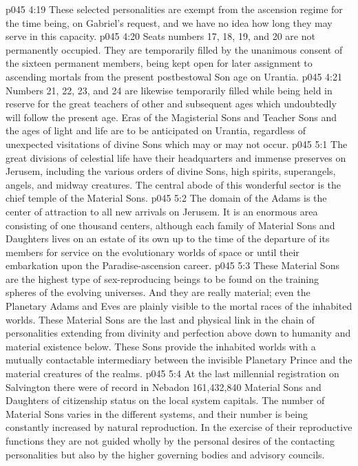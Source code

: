 \pc \vs p045 4:19 These selected personalities are exempt from the ascension regime for the time being, on Gabriel’s request, and we have no idea how long they may serve in this capacity.
\vs p045 4:20 Seats numbers 17, 18, 19, and 20 are not permanently occupied. They are temporarily filled by the unanimous consent of the sixteen permanent members, being kept open for later assignment to ascending mortals from the present postbestowal Son age on Urantia.
\vs p045 4:21 Numbers 21, 22, 23, and 24 are likewise temporarily filled while being held in reserve for the great teachers of other and subsequent ages which undoubtedly will follow the present age. Eras of the Magisterial Sons and Teacher Sons and the ages of light and life are to be anticipated on Urantia, regardless of unexpected visitations of divine Sons which may or may not occur.
\vs p045 5:1 The great divisions of celestial life have their headquarters and immense preserves on Jerusem, including the various orders of divine Sons, high spirits, superangels, angels, and midway creatures. The central abode of this wonderful sector is the chief temple of the Material Sons.
\vs p045 5:2 The domain of the Adams is the center of attraction to all new arrivals on Jerusem. It is an enormous area consisting of one thousand centers, although each family of Material Sons and Daughters lives on an estate of its own up to the time of the departure of its members for service on the evolutionary worlds of space or until their embarkation upon the Paradise\hyp{}ascension career.
\vs p045 5:3 These Material Sons are the highest type of sex\hyp{}reproducing beings to be found on the training spheres of the evolving universes. And they are really material; even the Planetary Adams and Eves are plainly visible to the mortal races of the inhabited worlds. These Material Sons are the last and physical link in the chain of personalities extending from divinity and perfection above down to humanity and material existence below. These Sons provide the inhabited worlds with a mutually contactable intermediary between the invisible Planetary Prince and the material creatures of the realms.
\pc \vs p045 5:4 At the last millennial registration on Salvington there were of record in Nebadon 161,432,840 Material Sons and Daughters of citizenship status on the local system capitals. The number of Material Sons varies in the different systems, and their number is being constantly increased by natural reproduction. In the exercise of their reproductive functions they are not guided wholly by the personal desires of the contacting personalities but also by the higher governing bodies and advisory councils.

